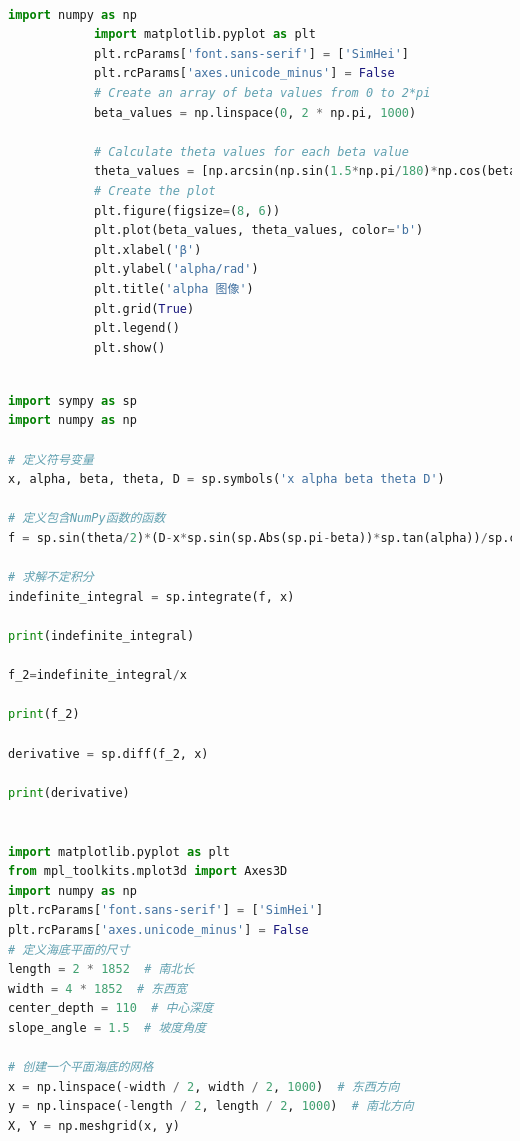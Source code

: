 \documentclass[withoutpreface,bwprint]{cumcmthesis} %
\begin{document}
\begin{appendices}
\begin{lstlisting}[language=Python]
            

        \end{lstlisting}
        \begin{lstlisting}[language=Python]
            import numpy as np
            import matplotlib.pyplot as plt
            plt.rcParams['font.sans-serif'] = ['SimHei']
            plt.rcParams['axes.unicode_minus'] = False
            # Create an array of beta values from 0 to 2*pi
            beta_values = np.linspace(0, 2 * np.pi, 1000)
            
            # Calculate theta values for each beta value
            theta_values = [np.arcsin(np.sin(1.5*np.pi/180)*np.cos(beta)) for beta in beta_values]
            # Create the plot
            plt.figure(figsize=(8, 6))
            plt.plot(beta_values, theta_values, color='b')
            plt.xlabel('β')
            plt.ylabel('alpha/rad')
            plt.title('alpha 图像')
            plt.grid(True)
            plt.legend()
            plt.show()
        \end{lstlisting}  
        \begin{lstlisting}[language=Python] 
           
import sympy as sp
import numpy as np

# 定义符号变量
x, alpha, beta, theta, D = sp.symbols('x alpha beta theta D')

# 定义包含NumPy函数的函数
f = sp.sin(theta/2)*(D-x*sp.sin(sp.Abs(sp.pi-beta))*sp.tan(alpha))/sp.cos(alpha-theta/2) + sp.sin(theta/2)*(D-x*sp.sin(sp.Abs(sp.pi-beta))*sp.tan(alpha))/sp.cos(alpha+theta/2)

# 求解不定积分
indefinite_integral = sp.integrate(f, x)

print(indefinite_integral)

f_2=indefinite_integral/x

print(f_2)

derivative = sp.diff(f_2, x)

print(derivative)


import matplotlib.pyplot as plt
from mpl_toolkits.mplot3d import Axes3D
import numpy as np
plt.rcParams['font.sans-serif'] = ['SimHei']
plt.rcParams['axes.unicode_minus'] = False
# 定义海底平面的尺寸
length = 2 * 1852  # 南北长
width = 4 * 1852  # 东西宽
center_depth = 110  # 中心深度
slope_angle = 1.5  # 坡度角度

# 创建一个平面海底的网格
x = np.linspace(-width / 2, width / 2, 1000)  # 东西方向
y = np.linspace(-length / 2, length / 2, 1000)  # 南北方向
X, Y = np.meshgrid(x, y)


\end{lstlisting}
\end{appendices}
\end{document}

